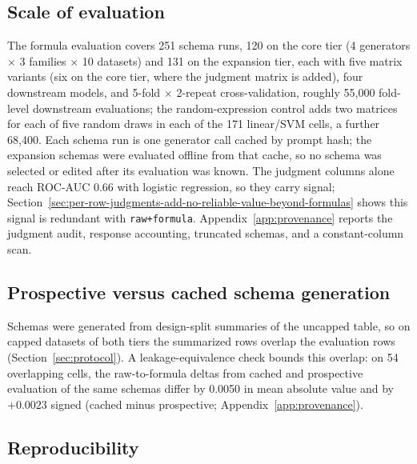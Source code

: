 \subsection{Scale of evaluation}\label{sec:scale-of-evaluation}

The formula evaluation covers 251 schema runs, 120 on the core tier (4 generators \(\times\) 3 families \(\times\) 10 datasets) and 131 on the expansion tier, each with five matrix variants (six on the core tier, where the judgment matrix is added), four downstream models, and 5-fold \(\times\) 2-repeat cross-validation, roughly 55,000 fold-level downstream evaluations; the random-expression control adds two matrices for each of five random draws in each of the 171 linear/SVM cells, a further 68,400. Each schema run is one generator call cached by prompt hash; the expansion schemas were evaluated offline from that cache, so no schema was selected or edited after its evaluation was known. The judgment columns alone reach ROC-AUC 0.66 with logistic regression, so they carry signal; Section~\ref{sec:per-row-judgments-add-no-reliable-value-beyond-formulas} shows this signal is redundant with \texttt{raw+formula}. Appendix~\ref{app:provenance} reports the judgment audit, response accounting, truncated schemas, and a constant-column scan.

\subsection{Prospective versus cached schema generation}\label{sec:leakage}

Schemas were generated from design-split summaries of the uncapped table, so on capped datasets of both tiers the summarized rows overlap the evaluation rows (Section~\ref{sec:protocol}). A leakage-equivalence check bounds this overlap: on 54 overlapping cells, the raw-to-formula deltas from cached and prospective evaluation of the same schemas differ by 0.0050 in mean absolute value and by \(+0.0023\) signed (cached minus prospective; Appendix~\ref{app:provenance}).

\subsection{Reproducibility}\label{sec:reproducibility}


